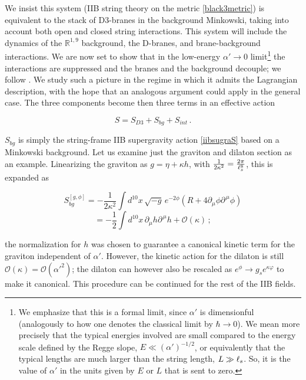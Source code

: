 We insist this system (IIB string theory on the metric \eqref{black3metric}) is equivalent to the stack of D3-branes in the background Minkowski, taking into account both open and closed string interactions. This system will include the dynamics of the $\mathbb{R}^{1,9}$ background, the D-branes, and brane-background interactions. We are now set to show that in the low-energy $\alpha' \rightarrow 0$ limit\footnote{We emphasize that this is a formal limit, since $\alpha'$ is dimensionful (analogously to how one denotes the classical limit by $\hbar \rightarrow 0$). We mean more precisely that the typical energies involved are small compared to the energy scale defined by the Regge slope, $E \ll (\alpha')^{-1/2}$, or equivalently that the typical lengths are much larger than the string length, $L \gg \ell_s$. So, it is the value of $\alpha'$ in the units given by $E$ or $L$ that is sent to zero.} the interactions are suppressed and the branes and the background decouple; we follow \cite{erdmenger}. We study such a picture in the regime in which it admits the Lagrangian description, with the hope that an analogous argument could apply in the general case. The three components become then three terms in an effective action

\begin{equation}
	S = S_{D3} + S_{bg} + S_{int}\,.
	\label{}
\end{equation}

$S_{bg}$ is simply the string-frame IIB supergravity action \eqref{iibsugraS} based on a Minkowski background. Let us examine just the graviton and dilaton section as an example. Linearizing the graviton as $g = \eta + \kappa h$, with $\frac{1}{2\kappa^2} = \frac{2\pi}{\ell_s^8}$, this is expanded as

\begin{equation}
	S_{bg}^{[g,\phi]} = - \frac{1}{2\kappa^2} \int d^{10}x \, \sqrt{-g} \, e^{-2\phi} (R + 4 \partial_\mu \phi \partial^{\,\mu} \phi) 
\end{equation}
\begin{equation}
	= - \frac{1}{2} \int d^{10} x \, \partial_\mu h \partial^{\,\mu} h + \mathcal{O}(\kappa)\,;
	\label{}
\end{equation}

the normalization for $h$ was chosen to guarantee a canonical kinetic term for the graviton independent of $\alpha'$. However, the kinetic action for the dilaton is still $\mathcal{O}(\kappa) = \mathcal{O}(\alpha'^2)$; the dilaton can however also be rescaled as $e^\phi \rightarrow g_s e^{\kappa \varphi}$ to make it canonical. This procedure can be continued for the rest of the IIB fields.

